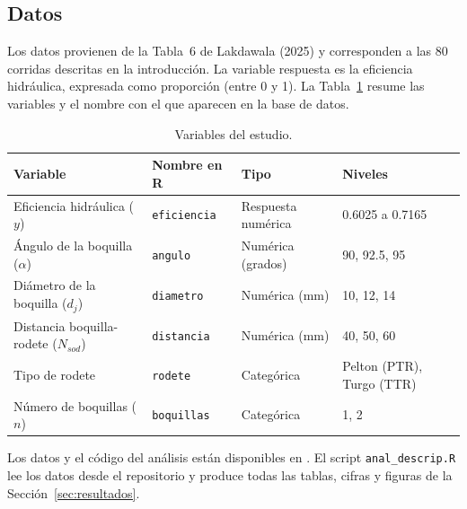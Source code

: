 \subsection{Datos}
\label{sec:datos}

Los datos provienen de la Tabla~6 de Lakdawala (2025) y corresponden a las 80 corridas descritas en la introducción. La variable respuesta es la eficiencia hidráulica, expresada como proporción (entre 0 y 1). La Tabla~\ref{tab:variables} resume las variables y el nombre con el que aparecen en la base de datos.

\begin{table}[H]
\centering
\caption{Variables del estudio.}
\label{tab:variables}
\begin{tabular}{llll}
\toprule
Variable & Nombre en R & Tipo & Niveles \\
\midrule
Eficiencia hidráulica ($y$)            & \texttt{eficiencia} & Respuesta numérica   & 0.6025 a 0.7165 \\
Ángulo de la boquilla ($\alpha$)       & \texttt{angulo}     & Numérica (grados)    & 90, 92.5, 95 \\
Diámetro de la boquilla ($d_j$)        & \texttt{diametro}   & Numérica (mm)        & 10, 12, 14 \\
Distancia boquilla-rodete ($N_{sod}$)  & \texttt{distancia}  & Numérica (mm)        & 40, 50, 60 \\
Tipo de rodete                         & \texttt{rodete}     & Categórica           & Pelton (PTR), Turgo (TTR) \\
Número de boquillas ($n$)              & \texttt{boquillas}  & Categórica           & 1, 2 \\
\bottomrule
\end{tabular}
\end{table}

Los datos y el código del análisis están disponibles en \enlacerepositorio. El script \texttt{anal\_descrip.R} lee los datos desde el repositorio y produce todas las tablas, cifras y figuras de la Sección~\ref{sec:resultados}.
